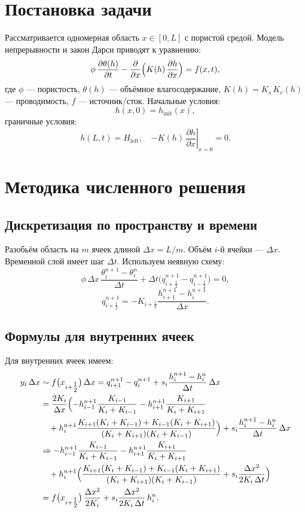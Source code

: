 \documentclass[a4paper,12pt]{article}
\begin{document}
\section{Постановка задачи}
Рассматривается одномерная область $x\in[0,L]$ с пористой средой. Модель непрерывности и закон Дарси приводят к уравнению:
\begin{equation}
\phi\,\frac{\partial \theta(h)}{\partial t}
-
\frac{\partial}{\partial x}
\Bigl(K(h)\,\frac{\partial h}{\partial x}\Bigr)
= f(x,t),
\end{equation}
где $\phi$ — пористость, $\theta(h)$ — объёмное влагосодержание, $K(h)=K_s\,K_r(h)$ — проводимость, $f$ — источник/сток. Начальные условия:
\[
h(x,0) = h_{\mathrm{init}}(x),
\]
граничные условия:
\[
h(L,t)=H_{\mathrm{left}},\quad
\left.-K(h)\,\frac{\partial h}{\partial x}\right|_{x=0}=0.
\]

\section{Методика численного решения}
\subsection{Дискретизация по пространству и времени}
Разобьём область на $m$ ячеек длиной $\Delta x = L/m$. Объём $i$-й ячейки — $\Delta x$. Временной слой имеет шаг $\Delta t$. Используем неявную схему:
\[
\phi\,\Delta x\,
\frac{\theta_i^{n+1}-\theta_i^n}{\Delta t}
+
\Delta t\bigl(q_{i+\frac12}^{n+1}-q_{i-\frac12}^{n+1}\bigr)
= 0,
\]
\[
q_{i+\frac12}^{n+1}
= -K_{i+\frac12}
\frac{h_{i+1}^{n+1}-h_i^{n+1}}{\Delta x}.
\]

\subsection{Формулы для внутренних ячеек}
Для внутренних ячеек имеем:
\begin{align}
y_i\,\Delta x 
&\sim f\bigl(x_{i+\tfrac12}\bigr)\,\Delta x
= q_{i+1}^{n+1}-q_i^{n+1}
+ s_i\frac{h_i^{n+1}-h_i^n}{\Delta t}\,\Delta x
\nonumber\\
&= \frac{2K_i}{\Delta x}
\Bigl(
- h_{i-1}^{n+1}\frac{K_{i-1}}{K_i+K_{i-1}}
- h_{i+1}^{n+1}\frac{K_{i+1}}{K_i+K_{i+1}}
\nonumber\\
&\quad
+ h_i^{n+1}\frac{K_{i+1}(K_i+K_{i-1}) + K_{i-1}(K_i+K_{i+1})}
{(K_i+K_{i+1})(K_i+K_{i-1})}
\Bigr)
+ s_i\frac{h_i^{n+1}-h_i^n}{\Delta t}\,\Delta x
\nonumber\\
&\Rightarrow 
- h_{i-1}^{n+1}\frac{K_{i-1}}{K_i+K_{i-1}}
- h_{i+1}^{n+1}\frac{K_{i+1}}{K_i+K_{i+1}}
\nonumber\\
&\quad
+ h_i^{n+1}\Bigl(\frac{K_{i+1}(K_i+K_{i-1}) + K_{i-1}(K_i+K_{i+1})}
{(K_i+K_{i+1})(K_i+K_{i-1})}
+ s_i\frac{\Delta x^2}{2K_i\,\Delta t}\Bigr)
\nonumber\\
&= f\bigl(x_{i+\tfrac12}\bigr)\,\frac{\Delta x^2}{2K_i}
+ s_i\frac{\Delta x^2}{2K_i\,\Delta t}\,h_i^n.
\end{align}
\end{document}
